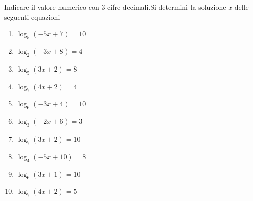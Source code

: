 \documentclass[onecolumn,11pt]{book}
\begin{document}
Indicare il valore numerico con 3 cifre decimali.Si determini la soluzione $x$ delle seguenti equazioni
\begin{enumerate}
 \item  $\log_ 5 ( -5 x + 7 )= 10 $ \item  $\log_ 2 ( -3 x + 8 )= 4 $ \item  $\log_ 5 ( 3 x + 2 )= 8 $ \item  $\log_ 7 ( 4 x + 2 )= 4 $ \item  $\log_ 6 ( -3 x + 4 )= 10 $ \item  $\log_ 3 ( -2 x + 6 )= 3 $ \item  $\log_ 7 ( 3 x + 2 )= 10 $ \item  $\log_ 4 ( -5 x + 10 )= 8 $ \item  $\log_ 6 ( 3 x + 1 )= 10 $ \item  $\log_ 7 ( 4 x + 2 )= 5 $
\end{enumerate}
\end{document}
